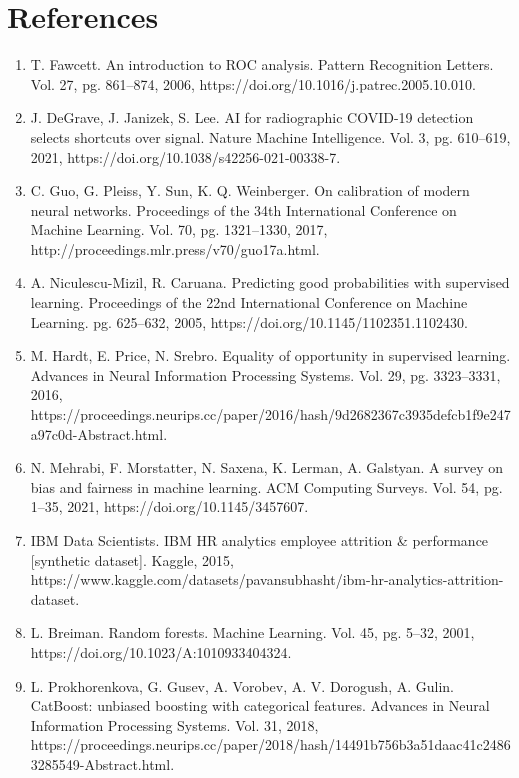 \documentclass[12pt]{article}
\begin{document}
\section*{References}
\sloppy
\begin{enumerate}
\item T. Fawcett. An introduction to ROC analysis. Pattern Recognition
  Letters. Vol. 27, pg. 861--874, 2006,
  https://doi.org/10.1016/j.patrec.2005.10.010.

\item J. DeGrave, J. Janizek, S. Lee. AI for radiographic COVID-19 detection
  selects shortcuts over signal. Nature Machine Intelligence. Vol. 3,
  pg. 610--619, 2021, https://doi.org/10.1038/s42256-021-00338-7.

\item C. Guo, G. Pleiss, Y. Sun, K. Q. Weinberger. On calibration of modern
  neural networks. Proceedings of the 34th International Conference on
  Machine Learning. Vol. 70, pg. 1321--1330, 2017,
  http://proceedings.mlr.press/v70/guo17a.html.

\item A. Niculescu-Mizil, R. Caruana. Predicting good probabilities with
  supervised learning. Proceedings of the 22nd International Conference on
  Machine Learning. pg. 625--632, 2005,
  https://doi.org/10.1145/1102351.1102430.

\item M. Hardt, E. Price, N. Srebro. Equality of opportunity in supervised
  learning. Advances in Neural Information Processing Systems. Vol. 29,
  pg. 3323--3331, 2016,
  https://proceedings.neurips.cc/paper/2016/hash/9d2682367c3935defcb1f9e247a97c0d-Abstract.html.

\item N. Mehrabi, F. Morstatter, N. Saxena, K. Lerman, A. Galstyan.
  A survey on bias and fairness in machine learning. ACM Computing Surveys.
  Vol. 54, pg. 1--35, 2021, https://doi.org/10.1145/3457607.

\item IBM Data Scientists. IBM HR analytics employee attrition \&
  performance [synthetic dataset]. Kaggle, 2015,
  https://www.kaggle.com/datasets/pavansubhasht/ibm-hr-analytics-attrition-dataset.

\item L. Breiman. Random forests. Machine Learning. Vol. 45, pg. 5--32,
  2001, https://doi.org/10.1023/A:1010933404324.

\item L. Prokhorenkova, G. Gusev, A. Vorobev, A. V. Dorogush, A. Gulin.
  CatBoost: unbiased boosting with categorical features. Advances in
  Neural Information Processing Systems. Vol. 31, 2018,
  https://proceedings.neurips.cc/paper/2018/hash/14491b756b3a51daac41c24863285549-Abstract.html.


\end{enumerate}
\end{document}
